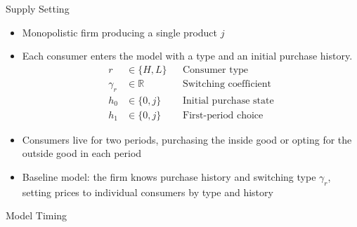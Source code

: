\documentclass[aspectratio=169,professionalfonts]{beamer}
\newcommand{\shortbuttons}{}
\begin{document}
\gdef\shortbuttons{}
\begin{frame}[label=short-6]{Supply Setting}
  \begin{itemize}
    \item Monopolistic firm producing a single product $j$
    \item Each consumer enters the model with a type and an initial purchase history. 
    \[
    \begin{aligned}
      r &\in \{H, L\}
        && \text{Consumer type} \\
      \gamma_r &\in \mathbb{R}
        && \text{Switching coefficient} \\
      h_0 &\in \{0, j\}
        && \text{Initial purchase state} \\
      h_1 &\in \{0, j\}
        && \text{First-period choice}
    \end{aligned}
    \]
    \item Consumers live for two periods, purchasing the inside good or opting for the outside good in each period
    \item Baseline model: the firm knows purchase history and switching type $\gamma_r$, setting prices to individual consumers by type and history
  \end{itemize}
\end{frame}

\begin{frame}{Model Timing}

\begin{center}
\end{center}

\end{frame}
\end{document}
